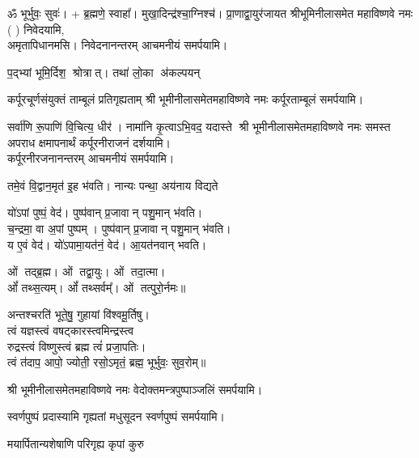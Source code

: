 \begin{center}
ॐ भूर्भुवः॒ सुवः॑। + ब्र॒ह्मणे॒ स्वाहा᳚।
 {मुखा॒दिन्द्र॑श्चा॒ग्निश्च॑। प्रा॒णाद्वा॒युर॑जायत}
श्रीभूमिनीलासमेत महाविष्णवे नमः (	) निवेदयामि, \\
अमृतापिधानमसि। निवेदनानन्तरम् आचमनीयं समर्पयामि।\medskip

{प॒द्भ्यां भूमि॒र्दिश॒ श्रोत्रात्। तथा॑ लो॒का अ॑कल्पयन्}

{कर्पूरचूर्णसंयुक्तं ताम्बूलं प्रतिगृह्यताम्}
श्री भूमीनीलासमेतमहाविष्णवे नमः कर्पूरताम्बूलं समर्पयामि।\medskip

{सर्वा॑णि रू॒पाणि॑ वि॒चित्य॒ धीर॑। नामा॑नि कृ॒त्वाऽभि॒वद॒\an{} यदास्ते}
श्री भूमीनीलासमेतमहाविष्णवे नमः समस्त अपराध क्षमापनार्थं कर्पूरनीराजनं दर्शयामि।\\
कर्पूरनीरजनानन्तरम् आचमनीयं समर्पयामि।\medskip

 {तमे॒वं वि॒द्वान॒मृत॑ इ॒ह भ॑वति। नान्यः पन्था॒ अय॑नाय विद्यते}

 यो॑ऽपां पुष्पं॒ वेद॑। पुष्प॑वान् प्र॒जावान् पशु॒मान् भ॑वति।\\
च॒न्द्रमा॒ वा अ॒पां पुष्पम्। पुष्प॑वान् प्र॒जावान् पशु॒मान् भ॑वति।\\
य ए॒वं वेद॑। यो॑ऽपामा॒यत॑नं॒ वेद॑। आ॒यत॑नवान् भवति।\medskip

ओं तद्ब्र॒ह्म। ओं तद्वा॒युः। ओं तदा॒त्मा।\\ ओं᳚ तथ्स॒त्यम्‌।
ओं᳚ तथ्सर्वम्᳚‌। ओं तत्पुरो॒र्नमः॥\medskip

अन्तश्चरति॑ भूते॒षु॒ गुहायां वि॑श्वमू॒र्तिषु। \\
त्वं यज्ञस्त्वं वषट्कारस्त्वमिन्द्रस्त्व\\ रुद्रस्त्वं विष्णुस्त्वं ब्रह्म त्वं॑ प्रजा॒पतिः। \\
त्वं त॑दाप॒ आपो॒ ज्योती॒ रसो॒ऽमृतं॒ ब्रह्म॒ भूर्भुवः॒ सुव॒रोम्‌॥\medskip

\medskip

श्री भूमीनीलासमेतमहाविष्णवे नमः वेदोक्तमन्त्रपुष्पाञ्जलिं समर्पयामि।\medskip

{स्वर्णपुष्पं प्रदास्यामि गृह्यतां मधुसूदन}
स्वर्णपुष्पं समर्पयामि।\medskip

{मयार्पितान्यशेषाणि परिगृह्य कृपां कुरु}


\end{center}
